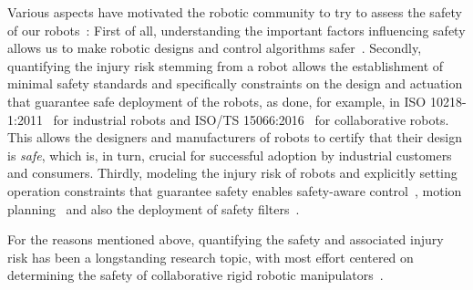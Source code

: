 Various aspects have motivated the robotic community to try to assess the safety of our robots~\citep{de2008atlas, van2018spatial}: 
First of all, understanding the important factors influencing safety allows us to make robotic designs and control algorithms safer~\citep{bicchi2004fast, zinn2004new}. 
Secondly, quantifying the injury risk stemming from a robot allows the establishment of minimal safety standards and specifically constraints on the design and actuation that guarantee safe deployment of the robots, as done, for example, in ISO 10218-1:2011~\citep{iso2011robots} for industrial robots and ISO/TS 15066:2016~\citep{Isots_15066_2016} for collaborative robots. This allows the designers and manufacturers of robots to certify that their design is \emph{safe}, which is, in turn, crucial for successful adoption by industrial customers and consumers.
Thirdly, modeling the injury risk of robots and explicitly setting operation constraints that guarantee safety enables safety-aware control~\citep{lacevic2011safety, zanchettin2015safety, mansfeld2018safety}, motion planning~\citep{lacevic2022safe, pupa2024efficient} and also the deployment of safety filters~\citep{hewing2020learning, bertino2023prescribed}.

For the reasons mentioned above, quantifying the safety and associated injury risk has been a longstanding research topic, with most effort centered on determining the safety of collaborative rigid robotic manipulators~\citep{zinn2004playing, bicchi2004fast, haddadin2009requirements, mansfeld2018safety}.